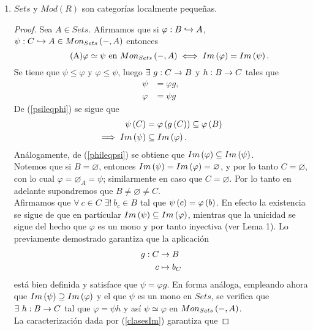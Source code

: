\documentclass{article}
\begin{document}
\begin{enumerate}[label=\textbf{Ej \arabic*.}]
		\item $Sets$ y $Mod(R)$ son categorías localmente pequeñas.
		\begin{proof}
			Sea $A\in Sets$. Afirmamos que si $\catarrow{\varphi}{B}{A}{m}$, $\catarrow{\psi}{C}{A}{m}\in\moncategory{Sets}{A}$ entonces
			\begin{equation*}\tag{A}\label{clasesIm}
				\varphi\simeq\psi \text{ en }Mon_{Sets}\left(-,A\right)\iff Im\left(\varphi\right)=Im\left(\psi\right).
			\end{equation*}
			\boxed{\implies} Se tiene que $\psi\leq\varphi$ y $\varphi\leq \psi$, luego $\exists\ \catarrow{g}{C}{B}{}$ y $\catarrow{h}{B}{C}{}$ tales que \begin{align*}
				\psi&=\varphi g,\tag{*}\label{psileqphi}\\
				\varphi&=\psi g\tag{**}\label{phileqpsi}
			\end{align*}
			De (\ref{psileqphi}) se sigue que
			\begin{align*}
				\psi\left(C\right)&=\varphi\left(g\left(C\right)\right)\subseteq\varphi\left(B\right)\\
				\implies Im\left(\psi\right)&\subseteq Im\left(\varphi\right).
			\end{align*}
			Análogamente, de (\ref{phileqpsi}) se obtiene que $Im\left(\varphi\right)\subseteq Im\left(\psi\right)$.\\
			\boxed{\impliedby} Notemos que si $B=\varnothing$, entonces
			$Im\left(\psi\right)=Im\left(\varphi\right)=\varnothing$, y por lo tanto $C=\varnothing$, con lo cual $\varphi=\varnothing_{A}=\psi$; similarmente en caso que $C=\varnothing$. Por lo tanto en adelante supondremos que $B\neq\varnothing\neq C$. \\
			Afirmamos que $\forall \ c\in C$ $\exists !\ b_c\in B$ tal que $\psi\left(c\right)=\varphi\left(b\right)$. En efecto la existencia se sigue de que en partícular $Im\left(\psi\right)\subseteq Im\left(\varphi\right)$, mientras que la unicidad se sigue del hecho que $\varphi$ es un mono y por tanto inyectiva (ver Lema 1). Lo previamente demostrado garantiza que la aplicación
			\begin{align*}
				g: C &\rightarrow B\\ c &\mapsto b_C
			\end{align*}
			está bien definida y satisface que $\psi=\varphi g$. En forma análoga, empleando ahora que $Im\left(\psi\right)\supseteq Im\left(\varphi\right)$ y el que $\psi$ es un mono en $Sets$, se verifica que $\exists\ \catarrow{h}{B}{C}{}$ tal que $\varphi=\psi h$ y así $\psi\simeq\varphi$ en $Mon_{Sets}\left(-,A\right)$.\\
			La caracterización dada por (\ref{clasesIm}) garantiza que

\end{proof}
\end{enumerate}
\end{document}
